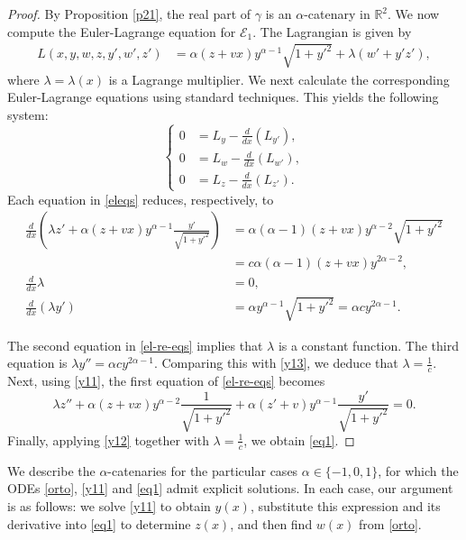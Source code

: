 \documentclass[a4paper,12pt]{amsart}
\theoremstyle{definition}
\def\r{\mathbb R}
\begin{document}
\begin{proof} 
 By Proposition \ref{p21}, the real part of $\gamma$ is an $\alpha$-catenary in $\r^2$.  We now compute the Euler-Lagrange equation for  $\mathcal{E}_1$.    The  Lagrangian   is given by 
\begin{equation*}
\begin{split}
L(x,y,w,z,y',w',z')&=\alpha (z+vx)y^{\alpha-1}\sqrt{1+y'^2}+\lambda(w'+y'z'),
\end{split}
\end{equation*}
where $\lambda=\lambda(x)$ is a Lagrange multiplier. We next calculate the corresponding Euler-Lagrange equations using standard techniques. This yields the following system:
\begin{equation} \label{eleqs}
\left\{
\begin{split}
0&=L_y-\frac{d}{dx}(L_{y'}),\\
0&=L_w-\frac{d}{dx}(L_{w'}),\\
0&=L_z-\frac{d}{dx}(L_{z'}) .
\end{split}
\right.
\end{equation}
Each equation in \eqref{eleqs} reduces, respectively, to
\begin{equation} \label{el-re-eqs}
\begin{split} 
 \frac{d}{dx}(\lambda z'+\alpha(z+vx)y^{\alpha-1}\frac{y'}{\sqrt{1+y'^2}})&=  \alpha (\alpha-1)(z+vx)y^{\alpha-2}\sqrt{1+y'^2} \\
 &=c\alpha(\alpha-1)(z+vx)y^{2\alpha-2},\\
 \frac{d}{dx}\lambda&=0,\\
 \frac{d}{dx}(\lambda y') &= \alpha y^{\alpha-1}\sqrt{1+y'^2}=\alpha c y^{2\alpha-1}.
 \end{split} \end{equation}
 
 The second equation in \eqref{el-re-eqs} implies that $\lambda$ is a constant function. The third equation is $\lambda y''=\alpha c y^{2\alpha-1}$. Comparing this  with \eqref{y13}, we deduce that $\lambda=\frac{1}{c}$. Next, using \eqref{y11}, the first equation of \eqref{el-re-eqs} becomes
 $$ \lambda z'' +\alpha(z+vx)y^{\alpha-2}\frac{1}{\sqrt{1+y'^2}} + \alpha(z'+v)y^{\alpha-1}\frac{y'}{\sqrt{1+y'^2}}= 0.$$
Finally, applying \eqref{y12} together with $\lambda=\frac{1}{c}$, we obtain \eqref{eq1}.

\end{proof}
 
We describe the $\alpha$-catenaries for the   particular cases $\alpha\in \{-1,0,1\} $, for which the ODEs \eqref{orto}, \eqref{y11} and \eqref{eq1} admit explicit solutions. In each case, our argument is as follows: we solve \eqref{y11} to obtain $y(x)$, substitute this expression and its derivative into \eqref{eq1} to determine $z(x)$, and then find $w(x)$ from \eqref{orto}. 
\end{document}
